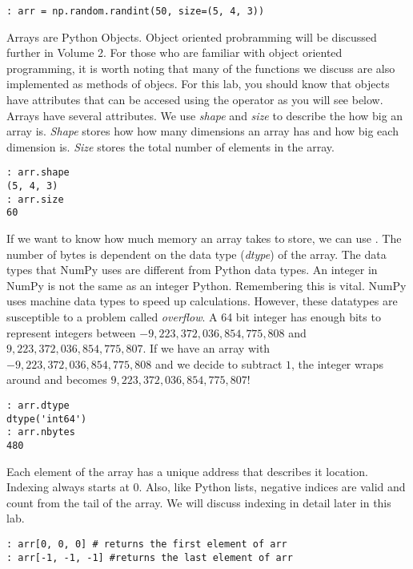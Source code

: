 \begin{lstlisting}
: arr = np.random.randint(50, size=(5, 4, 3))
\end{lstlisting}

Arrays are Python Objects.
Object oriented probramming will be discussed further in Volume 2.
For those who are familiar with object oriented programming, it is worth noting that many of the functions we discuss are also implemented as methods of  objecs.
For this lab, you should know that objects have attributes that can be accesed using the  operator as you will see below.
Arrays have several attributes.
We use \emph{shape} and \emph{size} to describe the how big an array is.
\emph{Shape} stores how how many dimensions an array has and how big each dimension is.
\emph{Size} stores the total number of elements in the array.

\begin{lstlisting}
: arr.shape
(5, 4, 3)
: arr.size
60
\end{lstlisting}

If we want to know how much memory an array takes to store, we can use .
The number of bytes is dependent on the data type (\emph{dtype}) of the array.
The data types that NumPy uses are different from Python data types.
An integer in NumPy is not the same as an integer Python.
Remembering this is vital.
NumPy uses machine data types to speed up calculations.
However, these datatypes are susceptible to a problem called \emph{overflow}.
A 64 bit integer has enough bits to represent integers between $-9,223,372,036,854,775,808$ and $9,223,372,036,854,775,807$.
If we have an array with $-9,223,372,036,854,775,808$ and we decide to subtract $1$, the integer wraps around and becomes $9,223,372,036,854,775,807$!  

\begin{lstlisting}
: arr.dtype
dtype('int64')
: arr.nbytes
480
\end{lstlisting}

Each element of the array has a unique address that describes it location.
Indexing always starts at $0$.
Also, like Python lists, negative indices are valid and count from the tail of the array.
We will discuss indexing in detail later in this lab.

\begin{lstlisting}
: arr[0, 0, 0] # returns the first element of arr
: arr[-1, -1, -1] #returns the last element of arr
\end{lstlisting}

